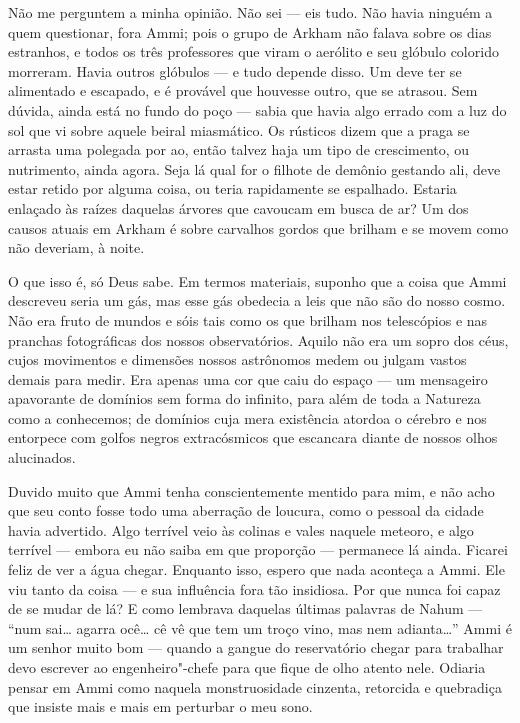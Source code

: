 Não me perguntem a minha opinião. Não sei --- eis tudo. Não havia
ninguém a quem questionar, fora Ammi; pois o grupo de Arkham não falava
sobre os dias estranhos, e todos os três professores que viram o
aerólito e seu glóbulo colorido morreram. Havia outros glóbulos --- e
tudo depende disso. Um deve ter se alimentado e escapado, e é provável
que houvesse outro, que se atrasou. Sem dúvida, ainda está no fundo do
poço --- sabia que havia algo
errado com a luz do sol que vi sobre aquele beiral miasmático. Os
rústicos dizem que a praga se arrasta uma polegada por ao, então talvez
haja um tipo de crescimento, ou nutrimento, ainda agora. Seja lá qual
for o filhote de demônio gestando ali, deve estar retido por alguma
coisa, ou teria rapidamente se espalhado. Estaria enlaçado às raízes
daquelas árvores que cavoucam em busca de ar? Um dos causos atuais em
Arkham é sobre carvalhos gordos que brilham e se movem como não
deveriam, à noite.

O que isso é, só Deus sabe. Em termos materiais, suponho que a coisa que
Ammi descreveu seria um gás, mas esse gás obedecia a leis que não são do
nosso cosmo. Não era fruto de mundos e sóis tais como os que brilham nos
telescópios e nas pranchas fotográficas dos nossos observatórios. Aquilo
não era um sopro dos céus, cujos movimentos e dimensões nossos
astrônomos medem ou julgam vastos demais para medir. Era apenas uma cor
que caiu do espaço --- um
mensageiro apavorante de domínios sem forma do infinito, para além de
toda a Natureza como a conhecemos; de domínios cuja mera existência
atordoa o cérebro e nos entorpece com golfos negros extracósmicos que
escancara diante de nossos olhos alucinados.

Duvido muito que Ammi tenha conscientemente mentido para mim, e não acho
que seu conto fosse todo uma aberração de loucura, como o pessoal da
cidade havia advertido. Algo terrível veio às colinas e vales naquele
meteoro, e algo terrível --- embora eu não saiba em que proporção ---
permanece lá ainda. Ficarei feliz de ver a água chegar. Enquanto isso,
espero que nada aconteça a Ammi. Ele viu tanto da
coisa --- e sua influência fora
tão insidiosa. Por que nunca foi capaz de se mudar de lá? E como
lembrava daquelas últimas palavras de Nahum --- ``num sai\ldots{} agarra
ocê\ldots{} cê vê que tem um troço vino, mas nem adianta\ldots{}'' Ammi é um
senhor muito bom --- quando a gangue do reservatório chegar para
trabalhar devo escrever ao engenheiro"-chefe para que fique de olho
atento nele. Odiaria pensar em Ammi como naquela monstruosidade
cinzenta, retorcida e quebradiça que insiste mais e mais em perturbar o
meu sono.
